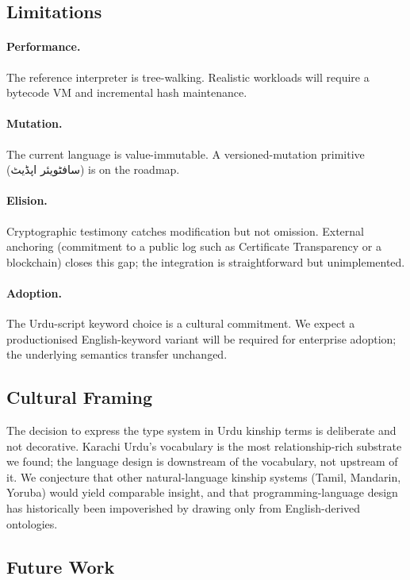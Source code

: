 \documentclass[10pt,twocolumn]{article}
\newcommand{\ur}[1]{{\urdufont #1}}
\begin{document}
\subsection{Limitations}

\paragraph{Performance.} The reference interpreter is tree-walking. Realistic workloads will require a bytecode VM and incremental hash maintenance.

\paragraph{Mutation.} The current language is value-immutable. A versioned-mutation primitive (\ur{سافٹویئر اپڈیٹ}) is on the roadmap.

\paragraph{Elision.} Cryptographic testimony catches modification but not omission. External anchoring (commitment to a public log such as Certificate Transparency or a blockchain) closes this gap; the integration is straightforward but unimplemented.

\paragraph{Adoption.} The Urdu-script keyword choice is a cultural commitment. We expect a productionised English-keyword variant will be required for enterprise adoption; the underlying semantics transfer unchanged.

\subsection{Cultural Framing}

The decision to express the type system in Urdu kinship terms is deliberate and not decorative. Karachi Urdu's vocabulary is the most relationship-rich substrate we found; the language design is downstream of the vocabulary, not upstream of it. We conjecture that other natural-language kinship systems (Tamil, Mandarin, Yoruba) would yield comparable insight, and that programming-language design has historically been impoverished by drawing only from English-derived ontologies.

\subsection{Future Work}
\end{document}
